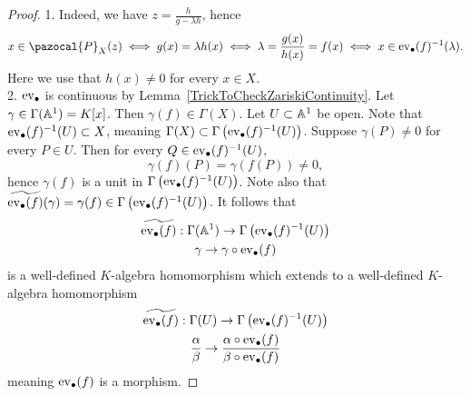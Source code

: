     \begin{proof}
        1. Indeed, we have $z= \frac{h}{g-\lambda h}$, hence 
        \begin{align*}
            x\in \pazocal{P}_X(z) \iff g(x)=\lambda h(x) \iff \lambda= \frac{g(x)}{h(x)}=f(x) \iff x\in \ev_\bullet(f)^{-1}(\lambda).
        \end{align*}
        Here we use that $h(x)\neq 0$ for every $x\in X$.\\
        2. $\mathrm{ev}_\bullet$ is continuous by Lemma~\ref{TrickToCheckZariskiContinuity}. Let $\gamma\in \Gamma(\mathbb{A}^1)=K[x]$. Then $\gamma(f)\in \Gamma(X)$. Let $U\subset \mathbb{A}^1$ be open. Note that $\mathrm{ev}_\bullet(f)^{-1}(U)\subset X$, meaning $\Gamma(X)\subset \Gamma\left(\mathrm{ev}_\bullet(f)^{-1}(U)\right)$. Suppose $\gamma(P)\neq 0$ for every $P\in U$. Then for every $Q\in \mathrm{ev}_\bullet(f)^{-1}(U)$,
        $$\gamma(f)(P)=\gamma(f(P))\neq 0,$$
        hence $\gamma(f)$ is a unit in $\Gamma\left(\mathrm{ev}_\bullet(f)^{-1}(U)\right)$. Note also that $\widetilde{\mathrm{ev}_\bullet(f)}(\gamma)=\gamma(f)\in \Gamma\left(\mathrm{ev}_\bullet(f)^{-1}(U)\right)$. It follows that 
        \begin{gather*}
            \widetilde{\mathrm{ev}_\bullet(f)}: \Gamma(\mathbb{A}^1)\rightarrow \Gamma\left(\mathrm{ev}_\bullet(f)^{-1}(U)\right)\\
            \gamma \rightarrow \gamma \circ \mathrm{ev}_\bullet(f)
        \end{gather*}
        is a well-defined $K$-algebra homomorphism which extends to a well-defined $K$-algebra homomorphism
        \begin{gather*}
            \widetilde{\mathrm{ev}_\bullet(f)}: \Gamma(U)\rightarrow \Gamma\left(\mathrm{ev}_\bullet(f)^{-1}(U)\right)\\
            \frac{\alpha}{\beta} \rightarrow \frac{\alpha \circ \mathrm{ev}_\bullet(f)}{\beta \circ \mathrm{ev}_\bullet(f)}
        \end{gather*}
        meaning $\mathrm{ev}_\bullet(f)$ is a morphism.
    \end{proof}
